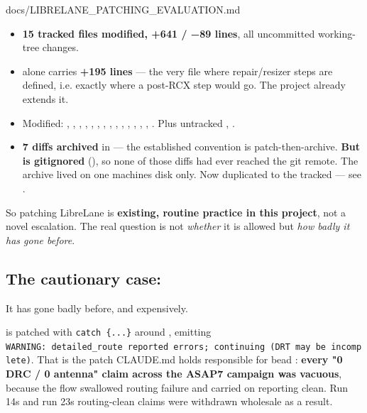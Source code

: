 \begin{relocated}{docs/LIBRELANE_PATCHING_EVALUATION.md}
\begin{itemize}
\tightlist
\item
  \textbf{15 tracked files modified, +641 / −89 lines}, all uncommitted
  working-tree changes.
\item
   alone carries \textbf{+195 lines}
  --- the very file where repair/\allowbreak{}resizer steps are defined,
  i.e. exactly where a post-RCX step would go. The project already
  extends it.
\item
  Modified: , ,
  , ,
  , , ,
  , ,
  , ,
  , ,
  , . Plus untracked
  , .
\item
  \textbf{7 diffs archived} in  --- the
  established convention is patch-then-archive. \warn{} \textbf{But
   is gitignored} (), so none of those
  diffs had ever reached the git remote. The archive lived on one
  machine\textquotesingle s disk only. Now duplicated to the tracked
   --- see
  .
\end{itemize}

So patching LibreLane is \textbf{existing, routine practice in this
project}, not a novel escalation. The real question is not
\emph{whether} it is allowed but \emph{how badly it has gone before}.

\subsection{\texorpdfstring{The cautionary case:
}{The cautionary case: }}\label{tm:pd:librelane-patching:the-cautionary-case-drttcl}

It has gone badly before, and expensively.

 is patched with
\texttt{catch\ \{.\allowbreak{}.\allowbreak{}.\allowbreak{}\}} around
, emitting
\texttt{WARNING:\allowbreak{}\ detailed\_\allowbreak{}route\ reported\ errors;\ continuing\ (DRT\ may\ be\ incomplete)}.
That is the patch CLAUDE.md holds responsible for bead :
\textbf{every "0 DRC / 0 antenna" claim across the ASAP7 campaign was
vacuous}, because the flow swallowed routing failure and carried on
reporting clean. Run 14\textquotesingle s and run 23\textquotesingle s
routing-clean claims were withdrawn wholesale as a result.


\end{relocated}
